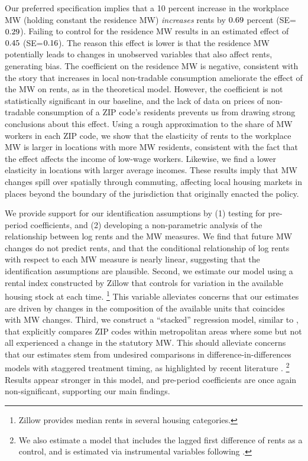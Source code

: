 Our preferred specification implies that 
a 10 percent increase in the workplace MW (holding constant the residence MW) 
\textit{increases} rents by $0.69$ percent 
(SE=$0.29$).
Failing to control for the residence MW results in an estimated effect of 
$0.45$ (SE=$0.16$).
The reason this effect is lower is that the residence MW potentially leads to 
changes in unobserved variables that also affect rents, generating bias.
The coefficient on the residence MW is negative, consistent with the story 
that increases in local non-tradable consumption ameliorate the effect of the
MW on rents, as in the theoretical model.
However, the coefficient is not statistically significant in our baseline,
and the lack of data on prices of non-tradable consumption of a ZIP code's 
residents prevents us from drawing strong conclusions about this effect.
Using a rough approximation to the share of MW workers in each ZIP code, we show 
that the elasticity of rents to the workplace MW is larger in locations 
with more MW residents, consistent with the fact that the effect affects 
the income of low-wage workers.
Likewise, we find a lower elasticity in locations with larger average incomes.
These results imply that MW changes spill over spatially through commuting, 
affecting local housing markets in places beyond the boundary of the 
jurisdiction that originally enacted the policy.


We provide support for our identification assumptions by
(1) testing for pre-period coefficients, and 
(2) developing a non-parametric analysis of the relationship between log rents
and the MW measures.
We find that future MW changes do not predict rents, and that the conditional
relationship of log rents with respect to each MW measure is nearly linear,
suggesting that the identification assumptions are plausible.
Second, we estimate our model using a rental index constructed by Zillow that 
controls for variation in the available housing stock at each time.%
\footnote{Zillow provides median rents in several housing categories.}
This variable alleviates concerns that our estimates are driven by changes in
the composition of the available units that coincides with MW changes.
Third, we construct a ``stacked'' regression model, similar to 
\textcite{CegnizEtAl2019}, that explicitly compares ZIP codes within 
metropolitan areas where some but not all experienced a change in the 
statutory MW.
This should alleviate concerns that our estimates stem from undesired 
comparisons in difference-in-differences models with staggered treatment 
timing, as highlighted by recent literature 
\parencite{deChaisemartinEtAl2022,RothEtAl2022}.%
\footnote{
    We also estimate a model that includes the lagged first difference of rents 
    as a control, and is estimated via instrumental variables following 
    \textcite{ArellanoBond1991}.}
Results appear stronger in this model, and pre-period coefficients are once again
non-significant, supporting our main findings.

